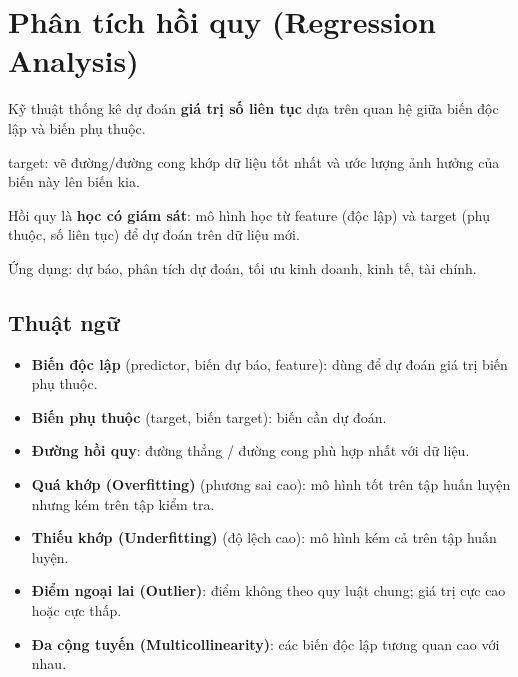 \section{Phân tích hồi quy (Regression Analysis)}
\label{sec:regression-analysis}

\begin{dinhnghia}[title={Phân tích hồi quy}]
Kỹ thuật thống kê dự đoán \textbf{giá trị số liên tục} dựa trên quan hệ giữa biến độc lập và biến phụ thuộc.

target: vẽ đường/đường cong khớp dữ liệu tốt nhất và ước lượng ảnh hưởng của biến này lên biến kia.
\end{dinhnghia}

\begin{ynghia}[title={Vai trò trong học máy}]
Hồi quy là \textbf{học có giám sát}: mô hình học từ feature (độc lập) và target (phụ thuộc, số liên tục) để dự đoán trên dữ liệu mới.

Ứng dụng: dự báo, phân tích dự đoán, tối ưu kinh doanh, kinh tế, tài chính.
\end{ynghia}

\subsection{Thuật ngữ}

\begin{phuongphap}[title={Thuật ngữ thường gặp}]
\begin{itemize}
  \item \textbf{Biến độc lập} (predictor, biến dự báo, feature): dùng để dự đoán giá trị biến phụ thuộc.
  \item \textbf{Biến phụ thuộc} (target, biến target): biến cần dự đoán.
  \item \textbf{Đường hồi quy}: đường thẳng / đường cong phù hợp nhất với dữ liệu.
  \item \textbf{Quá khớp (Overfitting)} (phương sai cao): mô hình tốt trên tập huấn luyện nhưng kém trên tập kiểm tra.
  \item \textbf{Thiếu khớp (Underfitting)} (độ lệch cao): mô hình kém cả trên tập huấn luyện.
  \item \textbf{Điểm ngoại lai (Outlier)}: điểm không theo quy luật chung; giá trị cực cao hoặc cực thấp.
  \item \textbf{Đa cộng tuyến (Multicollinearity)}: các biến độc lập tương quan cao với nhau.
\end{itemize}
\end{phuongphap}

